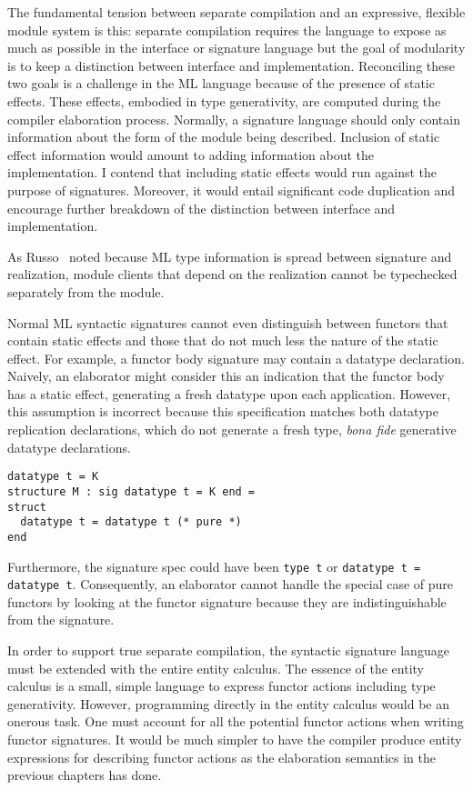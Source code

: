 The fundamental tension between separate compilation and an expressive, flexible module system is this: separate compilation requires the language to expose as much as possible in the interface or signature language but the goal of modularity is to keep a distinction between interface and implementation. Reconciling these two goals is a challenge in the ML language because of the presence of static effects. These effects, embodied in type generativity, are computed during the compiler elaboration process. Normally, a signature language should only contain information about the form of the module being described. Inclusion of static effect information would amount to adding information about the implementation. I contend that including static effects would run against the purpose of signatures. Moreover, it would entail significant code duplication and encourage further breakdown of the distinction between interface and implementation. 

As Russo~\cite{russothesis} noted because ML type information is spread between signature and realization, module clients that depend on the realization cannot be typechecked separately from the module. 

Normal ML syntactic signatures cannot even distinguish between functors that contain static effects and those that do not much less the nature of the static effect. For example, a functor body signature may contain a datatype declaration. Naively, an elaborator might consider this an indication that the functor body has a static effect, generating a fresh datatype upon each application. However, this assumption is incorrect because this specification matches both datatype replication declarations, which do not generate a fresh type,  \emph{bona fide} generative datatype declarations. 

\begin{lstlisting}
datatype t = K
structure M : sig datatype t = K end = 
struct
  datatype t = datatype t (* pure *)
end	
\end{lstlisting} 

Furthermore, the signature spec could have been \lstinline{type t} or \lstinline{datatype t = datatype t}. Consequently, an elaborator cannot handle the special case of pure functors by looking at the functor signature because they are indistinguishable from the signature. 

In order to support true separate compilation, the syntactic signature language must be extended with the entire entity calculus. The essence of the entity calculus is a small, simple language to express functor actions including type generativity. However, programming directly in the entity calculus would be an onerous task. One must account for all the potential functor actions when writing functor signatures. It would be much simpler to have the compiler produce entity expressions for describing functor actions as the elaboration semantics in the previous chapters has done. 

